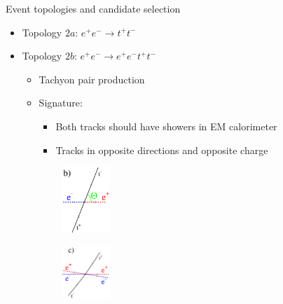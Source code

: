 \documentclass{beamer}
\begin{document}
\begin{frame}{Event topologies and candidate selection}
  \begin{itemize}
    \item{Topology $2a$: $e^+e^-\to t^+t^-$}
    \item{Topology $2b$: $e^+e^-\to e^+e^-t^+t^-$}
    \begin{itemize}
      \item{Tachyon pair production}
      \item{Signature:}
      \begin{itemize}
        \item{Both tracks should have showers in EM calorimeter}
        \item{Tracks in opposite directions and opposite charge}
      \end{itemize}
    \end{itemize}
  \end{itemize}
  \begin{figure}
    \centering
    \begin{subfigure}{0.5\textwidth}
      \centering
      \includegraphics[width = 0.2\textwidth]{TopologyB.png}
    \end{subfigure}%
    \begin{subfigure}{0.5\textwidth}
      \centering
      \includegraphics[width = 0.2\textwidth]{TopologyC.png}
    \end{subfigure}
  \end{figure}
\end{frame}
\end{document}
